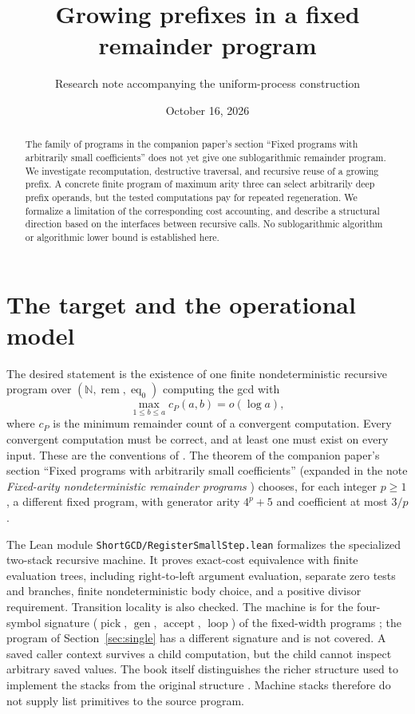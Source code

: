 \documentclass[11pt]{article}
\title{Growing prefixes in a fixed remainder program}
\author{Research note accompanying the uniform-process construction}
\date{October 16, 2026}
\newcommand{\rem}{\operatorname{rem}}
\newcommand{\eq}{\operatorname{eq}}
\begin{document}
\maketitle

\begin{abstract}
The family of programs in the companion paper's section ``Fixed programs
with arbitrarily small coefficients'' does not yet give one sublogarithmic
remainder program. We investigate recomputation, destructive traversal, and recursive
reuse of a growing prefix. A concrete finite program of maximum arity three
can select arbitrarily deep prefix operands, but the tested computations pay
for repeated regeneration. We formalize a limitation of the corresponding
cost accounting, and describe a structural direction based on the interfaces
between recursive calls. No sublogarithmic algorithm or algorithmic lower
bound is established here.
\end{abstract}

\section{The target and the operational model}

The desired statement is the existence of one finite nondeterministic
recursive program over $(\mathbb N,\rem,\eq_0)$ computing the gcd with
\[
\max_{1\leq b\leq a} c_P(a,b)=o(\log a),
\]
where $c_P$ is the minimum remainder count of a convergent computation.
Every convergent computation must be correct, and at least one must exist
on every input. These are the conventions of \cite[\S2E]{book}.
The theorem of the companion paper's section ``Fixed programs with
arbitrarily small coefficients'' \cite{companion} (expanded in the note \emph{Fixed-arity nondeterministic remainder programs}
\cite{nondet}) chooses, for each integer $p\geq1$, a different fixed program,
with generator arity $4^p+5$ and coefficient at most $3/p$.

The Lean module \texttt{ShortGCD/RegisterSmallStep.lean} formalizes the specialized
two-stack recursive machine. It proves exact-cost equivalence with finite
evaluation trees, including right-to-left argument evaluation, separate zero
tests and branches, finite nondeterministic body choice, and a positive
divisor requirement. Transition locality is also checked. The machine is
for the four-symbol signature ($\operatorname{pick}$, $\operatorname{gen}$,
$\operatorname{accept}$, $\operatorname{loop}$) of the fixed-width programs
\cite{nondet}; the program of Section~\ref{sec:single} has a different
signature and is not covered. A saved caller
context survives a child computation, but the child cannot inspect arbitrary
saved values. The book itself distinguishes the richer structure used to
implement the stacks from the original structure \cite[p.~78]{book}.
Machine stacks therefore do not supply list primitives to the source program.
\end{document}
